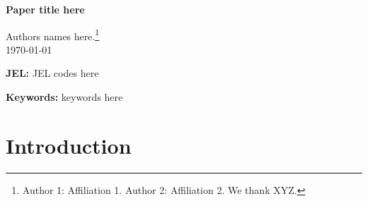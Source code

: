 \documentclass[12pt]{article}%
\begin{document}

\begin{titlepage}
\vspace*{.25cm}
\begin{center}
\renewcommand{\thefootnote}{\fnsymbol{footnote}}
\textbf{
\noindent\LARGE
Paper title here
}

\vspace{.7cm}
{\Large Authors names here.\footnote{Author 1: Affiliation 1. Author 2: Affiliation 2. We thank XYZ.}} \\

\vspace{.25cm}
{\Large\today}\\
\vspace{.25cm}
\end{center}

\begin{abstract}
\begin{normalsize}
\begin{singlespace}
abstract here
\end{singlespace}
\end{normalsize}
\end{abstract}



\noindent\textbf{JEL:} JEL codes here

\vspace{.6cm} 

\noindent\textbf{Keywords:} keywords here
\setcounter{footnote}{0}


\end{titlepage}

\newpage


 \FloatBarrier
\section{Introduction} \label{sec:intro}
\end{document}

